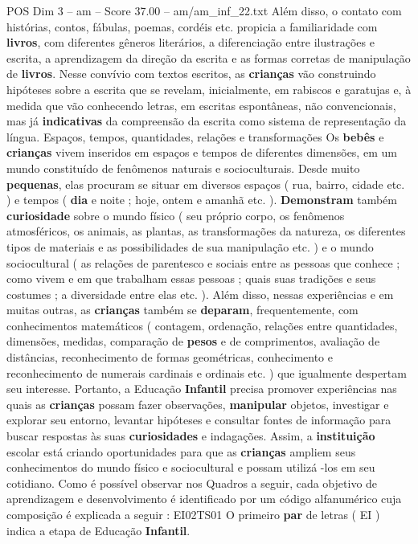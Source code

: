 \begin{textsample}{POS Dim 3 – am – Score 37.00 – am/am\_inf\_22.txt}
Além disso, o contato com histórias, contos, fábulas, poemas, cordéis etc. propicia a familiaridade com \textbf{livros}, com diferentes gêneros literários, a diferenciação entre ilustrações e escrita, a aprendizagem da direção da escrita e as formas corretas de manipulação de \textbf{livros}.
Nesse convívio com textos escritos, as \textbf{crianças} vão construindo hipóteses sobre a escrita que se revelam, inicialmente, em rabiscos e garatujas e, à medida que vão conhecendo letras, em escritas espontâneas, não convencionais, mas já \textbf{indicativas} da compreensão da escrita como sistema de representação da língua.
Espaços, tempos, quantidades, relações e transformações Os \textbf{bebês} e \textbf{crianças} vivem inseridos em espaços e tempos de diferentes dimensões, em um mundo constituído de fenômenos naturais e socioculturais.
Desde muito \textbf{pequenas}, elas procuram se situar em diversos espaços ( rua, bairro, cidade etc. ) e tempos ( \textbf{dia} e noite ; hoje, ontem e amanhã etc. ). \textbf{Demonstram} também \textbf{curiosidade} sobre o mundo físico ( seu próprio corpo, os fenômenos atmosféricos, os animais, as plantas, as transformações da natureza, os diferentes tipos de materiais e as possibilidades de sua manipulação etc. ) e o mundo sociocultural ( as relações de parentesco e sociais entre as pessoas que conhece ; como vivem e em que trabalham essas pessoas ; quais suas tradições e seus costumes ; a diversidade entre elas etc. ).
Além disso, nessas experiências e em muitas outras, as \textbf{crianças} também se \textbf{deparam}, frequentemente, com conhecimentos matemáticos ( contagem, ordenação, relações entre quantidades, dimensões, medidas, comparação de \textbf{pesos} e de comprimentos, avaliação de distâncias, reconhecimento de formas geométricas, conhecimento e reconhecimento de numerais cardinais e ordinais etc. ) que igualmente despertam seu interesse.
Portanto, a Educação \textbf{Infantil} precisa promover experiências nas quais as \textbf{crianças} possam fazer observações, \textbf{manipular} objetos, investigar e explorar seu entorno, levantar hipóteses e consultar fontes de informação para buscar respostas às suas \textbf{curiosidades} e indagações.
Assim, a \textbf{instituição} escolar está criando oportunidades para que as \textbf{crianças} ampliem seus conhecimentos do mundo físico e sociocultural e possam utilizá -los em seu cotidiano.
Como é possível observar nos Quadros a seguir, cada objetivo de aprendizagem e desenvolvimento é identificado por um código alfanumérico cuja composição é explicada a seguir : EI02TS01 O primeiro \textbf{par} de letras ( EI ) indica a etapa de Educação \textbf{Infantil}.

\end{textsample}
